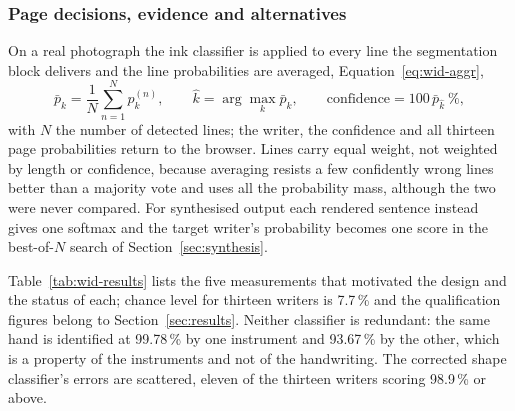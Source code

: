 \subsubsection{Page decisions, evidence and alternatives}

On a real photograph the ink classifier is applied to every line the segmentation block delivers and the line probabilities are averaged, Equation~\ref{eq:wid-aggr},
\begin{equation}
\bar p_k=\frac1N\sum_{n=1}^Np^{(n)}_k,\qquad\hat k=\arg\max_k\bar p_k,\qquad\text{confidence}=100\,\bar p_{\hat k}\ \%,
\label{eq:wid-aggr}
\end{equation}
with $N$ the number of detected lines; the writer, the confidence and all thirteen page probabilities return to the browser.
Lines carry equal weight, not weighted by length or confidence, because averaging resists a few confidently wrong lines better than a majority vote and uses all the probability mass, although the two were never compared.
For synthesised output each rendered sentence instead gives one softmax and the target writer's probability becomes one score in the best-of-$N$ search of Section~\ref{sec:synthesis}.

Table~\ref{tab:wid-results} lists the five measurements that motivated the design and the status of each; chance level for thirteen writers is 7.7\,\% and the qualification figures belong to Section~\ref{sec:results}.
Neither classifier is redundant: the same hand is identified at 99.78\,\% by one instrument and 93.67\,\% by the other, which is a property of the instruments and not of the handwriting.
The corrected shape classifier's errors are scattered, eleven of the thirteen writers scoring 98.9\,\% or above.

